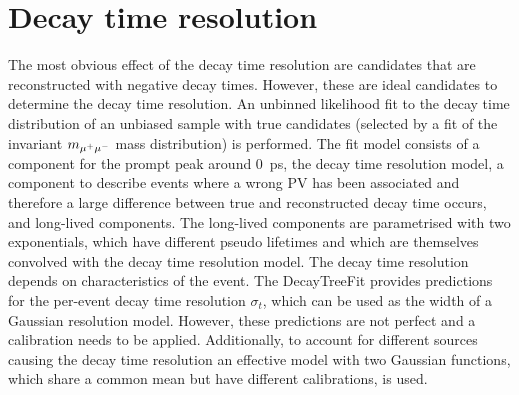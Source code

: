 \section{Decay time resolution}
\label{sec:bd2jpsiks:decaytime:resolution}

The most obvious effect of the decay time resolution are candidates that are
reconstructed with negative decay times. However, these are ideal candidates
to determine the decay time resolution. An unbinned likelihood fit to the
decay time distribution of an unbiased \BdToJPsiKS sample with true \JPsi
candidates (selected by a fit of the invariant $m_{{\mu^+\mu^-}}$ mass distribution)
is performed. The fit model consists of a component for the prompt peak around
\SI{0}{\ps}, \ie the decay time resolution model, a component to describe
events where a wrong PV has been associated and therefore a large difference
between true and reconstructed decay time occurs, and long-lived components.
The long-lived components are parametrised with two exponentials, which have
different pseudo lifetimes and which are themselves convolved with the decay
time resolution model. The decay time resolution depends on characteristics of
the event. The DecayTreeFit provides predictions for the per-event decay time
resolution $\sigma_t$, which can be used as the width of a Gaussian resolution
model. However, these predictions are not perfect and a calibration needs to
be applied. Additionally, to account for different sources causing the decay
time resolution an effective model with two Gaussian functions, which share a
common mean but have different calibrations, is used.

